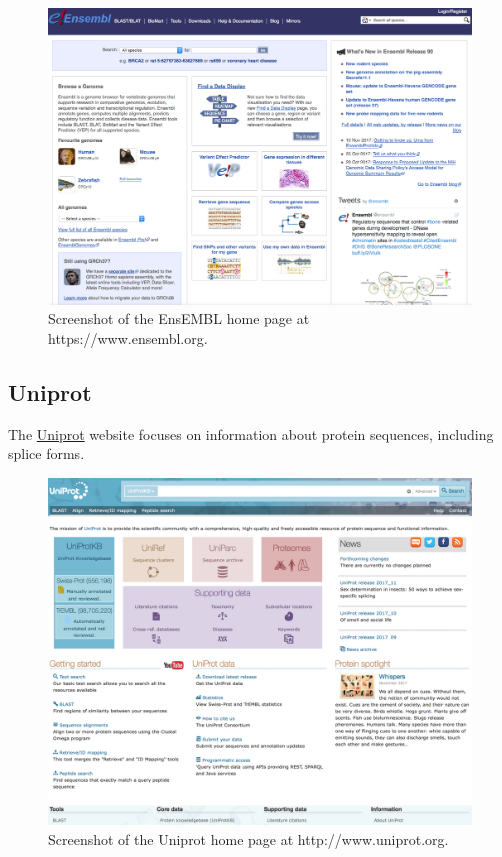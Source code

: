 \documentclass[]{book}
\theoremstyle{definition}
\theoremstyle{definition}
\theoremstyle{definition}
\theoremstyle{remark}
\begin{document}
\begin{figure}
\includegraphics[width=17.04in]{pic/ensembl_web} \caption{Screenshot of the EnsEMBL home page at https://www.ensembl.org.}\label{fig:ensembl-web}
\end{figure}

\subsection{Uniprot}\label{uniprot}

The \href{http://www.uniprot.org}{Uniprot} website focuses on
information about protein sequences, including splice forms.

\begin{figure}
\includegraphics[width=16.94in]{pic/uniprot_web} \caption{Screenshot of the Uniprot home page at http://www.uniprot.org.}\label{fig:uniprot-web}
\end{figure}
\end{document}
